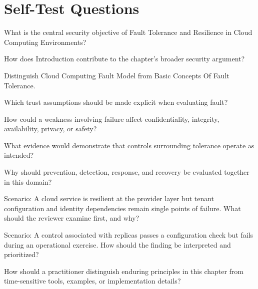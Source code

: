 \documentclass[11pt,letterpaper]{article}
\begin{document}
\section*{Self-Test Questions}
\begin{CornellRecallList}
\item What is the central security objective of Fault Tolerance and Resilience in Cloud Computing Environments?
\item How does Introduction contribute to the chapter's broader security argument?
\item Distinguish Cloud Computing Fault Model from Basic Concepts Of Fault Tolerance.
\item Which trust assumptions should be made explicit when evaluating fault?
\item How could a weakness involving failure affect confidentiality, integrity, availability, privacy, or safety?
\item What evidence would demonstrate that controls surrounding tolerance operate as intended?
\item Why should prevention, detection, response, and recovery be evaluated together in this domain?
\item Scenario: A cloud service is resilient at the provider layer but tenant configuration and identity dependencies remain single points of failure. What should the reviewer examine first, and why?
\item Scenario: A control associated with replicas passes a configuration check but fails during an operational exercise. How should the finding be interpreted and prioritized?
\item How should a practitioner distinguish enduring principles in this chapter from time-sensitive tools, examples, or implementation details?
\end{CornellRecallList}
\end{document}
